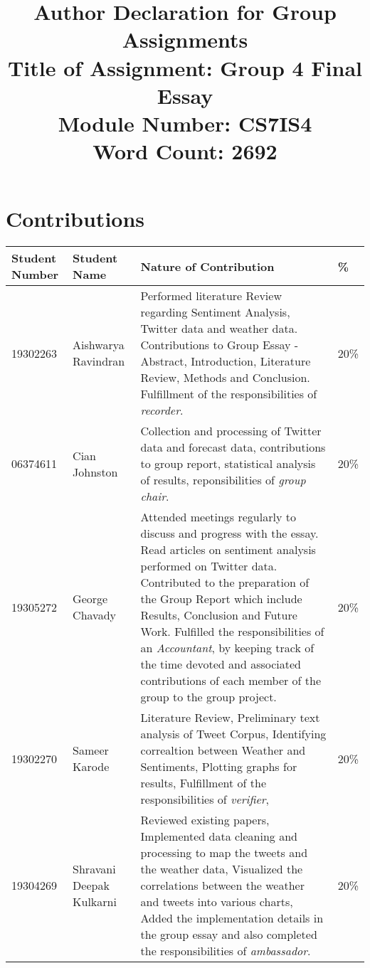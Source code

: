\documentclass[a4paper,10pt]{article}
\begin{document}
\title{
    Author Declaration for Group Assignments \\
    \small Title of Assignment: Group 4 Final Essay \\
    \small Module Number: CS7IS4 \\
    \small Word Count: 2692
}
\author{}

\maketitle
\section{Contributions}
\begin{tabular}{ | p{2cm} | p{2cm} | p{10cm} | l | }
\hline
Student Number & Student Name & Nature of Contribution & \% \\ \hline
19302263 & Aishwarya Ravindran & Performed literature Review regarding Sentiment Analysis, Twitter data and weather data. Contributions to Group Essay - Abstract, Introduction, Literature Review, Methods and Conclusion. Fulfillment of the responsibilities of \textit{recorder}. & 20\% \\ \hline
06374611 & Cian Johnston & Collection and processing of Twitter data and forecast data, contributions to group report, statistical analysis of results, reponsibilities of \textit{group chair}. & 20\% \\ \hline
19305272 & George Chavady & Attended meetings regularly to discuss and progress with the essay. Read articles on sentiment analysis performed on Twitter data. Contributed to the preparation of the Group Report which include Results, Conclusion and Future Work. Fulfilled the responsibilities of an \textit{Accountant}, by keeping track of the time devoted and associated contributions of each member of the group to the group project. & 20\% \\ \hline
19302270 & Sameer Karode & Literature Review, Preliminary text analysis of Tweet Corpus, Identifying correaltion between Weather and Sentiments, Plotting graphs for results, Fulfillment of the responsibilities of \textit{verifier}, & 20\% \\ \hline
19304269 & Shravani Deepak Kulkarni & Reviewed existing papers, Implemented data cleaning and processing to map the tweets and the weather data, Visualized the correlations between the weather and tweets into various charts, Added the implementation details in the group essay and also completed the responsibilities of \textit{ambassador}. & 20\% \\ \hline
\end{tabular}
\end{document}

